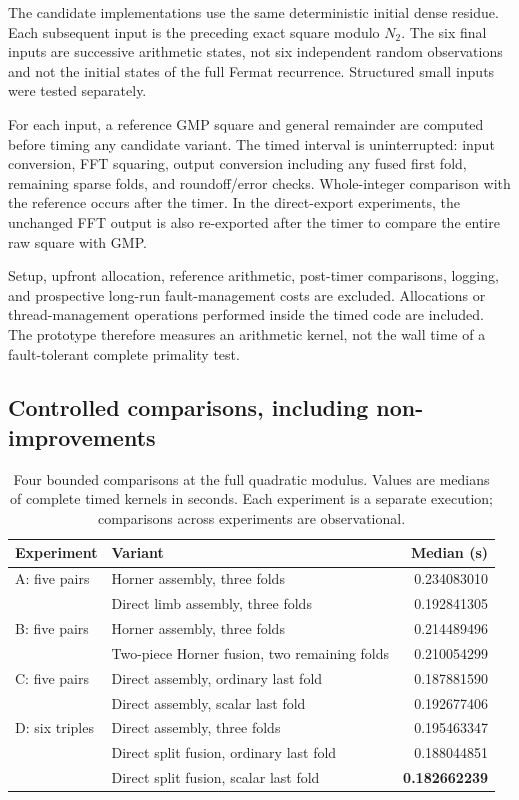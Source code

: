 \documentclass[11pt,a4paper]{article}
\theoremstyle{definition}
\begin{document}
The candidate implementations use the same deterministic initial dense
residue. Each subsequent input is the preceding exact square modulo $N_2$.
The six final inputs are successive arithmetic states, not six independent
random observations and not the initial states of the full Fermat recurrence.
Structured small inputs were tested separately.

For each input, a reference GMP square and general remainder are computed
before timing any candidate variant. The timed interval is uninterrupted:
input conversion, FFT squaring, output conversion including any fused first
fold, remaining sparse folds, and roundoff/error checks. Whole-integer
comparison with the reference occurs after the timer. In the direct-export
experiments, the unchanged FFT output is also re-exported after the timer
to compare the entire raw square with GMP.

Setup, upfront allocation, reference arithmetic, post-timer comparisons,
logging, and prospective long-run fault-management costs are excluded.
Allocations or thread-management operations performed inside the timed
code are included. The prototype therefore measures an arithmetic kernel,
not the wall time of a fault-tolerant complete primality test.

\subsection{Controlled comparisons, including non-improvements}

\begin{table}[htbp]
\centering\small
\caption{Four bounded comparisons at the full quadratic modulus. Values are
medians of complete timed kernels in seconds. Each experiment is a separate
execution; comparisons across experiments are observational.}
\label{tab:ablations}
\begin{tabularx}{\linewidth}{@{}l X r@{}}
\toprule
Experiment & Variant & Median (s)\\
\midrule
A: five pairs & Horner assembly, three folds & 0.234083010\\
 & Direct limb assembly, three folds & 0.192841305\\
\addlinespace
B: five pairs & Horner assembly, three folds & 0.214489496\\
 & Two-piece Horner fusion, two remaining folds & 0.210054299\\
\addlinespace
C: five pairs & Direct assembly, ordinary last fold & 0.187881590\\
 & Direct assembly, scalar last fold & 0.192677406\\
\addlinespace
D: six triples & Direct assembly, three folds & 0.195463347\\
 & Direct split fusion, ordinary last fold & 0.188044851\\
 & Direct split fusion, scalar last fold & \textbf{0.182662239}\\
\bottomrule
\end{tabularx}
\end{table}
\end{document}
